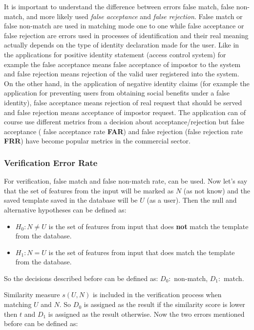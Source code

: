 It is important to understand the difference between errors false match, false non-match, and more likely used \emph{false acceptance} and \emph{false rejection}. False match or false non-match are used in matching mode one to one while false acceptance or false rejection are errors used in processes of identification and their real meaning actually depends on the type of identity declaration made for the user. Like in the applications for positive identity statement (access control system) for example the false acceptance means false acceptance of impostor to the system and false rejection means rejection of the valid user registered into the system. On the other hand, in the application of negative identity claims (for example the application for preventing users from obtaining social benefits under a false identity), false acceptance means rejection of real request that should be served and false rejection means acceptance of impostor request. The application can of course use different metrics from a decision about acceptance/rejection but false acceptance ( false acceptance rate \textbf{FAR}) and false rejection (false rejection rate \textbf{FRR}) have become popular metrics in the commercial sector. \cite{far_described} \cite{maltoni2009handbook}

\subsubsection{Verification Error Rate}
For verification, false match and false non-match rate, can be used. Now let's say that the set of features from the input will be marked as $N$ (as not know) and the saved template saved in the database will be $U$ (as a user). Then the null and alternative hypotheses can be defined as: \cite{maltoni2009handbook} \cite{fnmr_1}

\begin{itemize}[label={}]
    \item $H_0: N \neq U$ is the set of features from input that does \textbf{not} match the template from the database.
    \item $H_1: N = U$ is the set of features from input that does match the template from the database.
\end{itemize}

So the decisions described before can be defined as: $D_0:$ non-match, $D_1:$ match. \cite{maltoni2009handbook} \cite{fnmr_1}

Similarity measure $s(U, N)$ is included in the verification process when matching $U$ and $N$. So $D_0$ is assigned as the result if the similarity score is lower then $t$ and $D_1$ is assigned as the result otherwise. Now the two errors mentioned before can be defined as: \cite{maltoni2009handbook}

